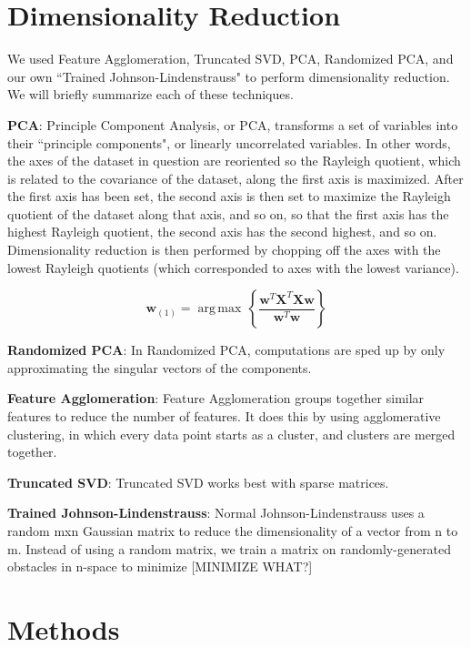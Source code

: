 \documentclass[12pt]{article}
\begin{document}
\section{Dimensionality Reduction}

We used Feature Agglomeration, Truncated SVD, PCA, Randomized PCA, and
our own ``Trained Johnson-Lindenstrauss" to perform dimensionality reduction. We will briefly summarize each of these techniques.

\textbf{PCA}: Principle Component Analysis, or PCA, transforms a set of variables into 
their ``principle components", or linearly uncorrelated variables. In other words, the axes of the dataset in question are reoriented so the Rayleigh quotient, which is related to the covariance of the dataset, along the first axis is maximized. After the first axis has been set, the second axis is then set to maximize the Rayleigh quotient of the dataset along that axis, and so on, so that the first axis has the highest Rayleigh quotient, the second axis has the second highest, and so on. Dimensionality reduction is then performed by chopping off the axes with the lowest Rayleigh quotients (which corresponded to axes with the lowest variance).

$$
\mathbf{w}_{(1)} = {\operatorname{\arg\,max}}\, \left\{ \frac{\mathbf{w}^T\mathbf{X}^T \mathbf{X w}}{\mathbf{w}^T \mathbf{w}} \right\}
$$


\textbf{Randomized PCA}: In Randomized PCA, computations are sped up by only approximating the singular vectors of the components.

\textbf{Feature Agglomeration}: Feature Agglomeration groups together similar features to reduce the number of features. It does this by using agglomerative clustering, in which every data point starts as a cluster, and clusters are merged together.

\textbf{Truncated SVD}: Truncated SVD works best with sparse matrices.

\textbf{Trained Johnson-Lindenstrauss}: Normal Johnson-Lindenstrauss uses a random mxn Gaussian matrix to reduce the dimensionality of a vector from n to m. Instead of using a random matrix, we train a matrix on randomly-generated obstacles in n-space to minimize [MINIMIZE WHAT?]

\section{Methods}
\end{document}
